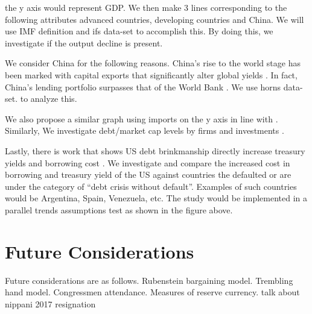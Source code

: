 \documentclass[
  12pt]{article}
\begin{document}
the y axis would represent GDP. We then make 3 lines corresponding to
the following attributes advanced countries, developing countries and
China. We will use IMF definition and ifs data-set to accomplish this.
By doing this, we investigate if the output decline \citep{yeyati2011}
is present.

We consider China for the following reasons. China's rise to the world
stage has been marked with capital exports that significantly alter
global yields \citep{alfaro2014, gourinchas}. In fact, China's lending
portfolio surpasses that of the World Bank \citep{horn2021} . We use
horns data-set. to analyze this.

We also propose a similar graph using imports on the y axis in line with
\citep{mendoza2012}. Similarly, We investigate debt/market cap levels by
firms \citep{corsetti2012, das2010, gourinchas2016} and investments
\citep{almeida2017}.

Lastly, there is work that shows US debt brinkmanship directly increase
treasury yields and borrowing cost \citep{nippani2017}. We investigate
and compare the increased cost in borrowing and treasury yield of the US
against countries the defaulted or are under the category of ``debt
crisis without default''. Examples of such countries would be Argentina,
Spain, Venezuela, etc. The study would be implemented in a parallel
trends assumptions test as shown in the figure above.

\hypertarget{future-considerations}{%
\section{Future Considerations}\label{future-considerations}}

Future considerations are as follows. Rubenstein bargaining model.
Trembling hand model. Congressmen attendance. Measures of reserve
currency. talk about nippani 2017 resignation


\renewcommand\refname{References}
  
\end{document}
